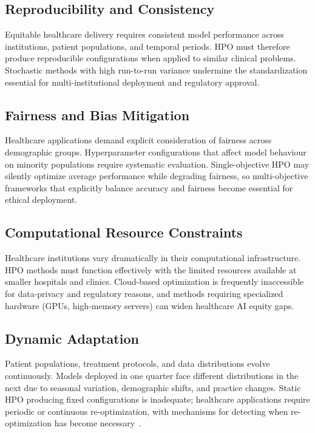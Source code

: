 \documentclass[letterpaper, 10 pt, conference]{ieeeconf}
\begin{document}
\subsection{Reproducibility and Consistency}

Equitable healthcare delivery requires consistent model performance across institutions, patient populations, and temporal periods. HPO must therefore produce reproducible configurations when applied to similar clinical problems. Stochastic methods with high run-to-run variance undermine the standardization essential for multi-institutional deployment and regulatory approval.

\subsection{Fairness and Bias Mitigation}

Healthcare applications demand explicit consideration of fairness across demographic groups. Hyperparameter configurations that affect model behaviour on minority populations require systematic evaluation. Single-objective HPO may silently optimize average performance while degrading fairness, so multi-objective frameworks that explicitly balance accuracy and fairness become essential for ethical deployment.

\subsection{Computational Resource Constraints}

Healthcare institutions vary dramatically in their computational infrastructure. HPO methods must function effectively with the limited resources available at smaller hospitals and clinics. Cloud-based optimization is frequently inaccessible for data-privacy and regulatory reasons, and methods requiring specialized hardware (GPUs, high-memory servers) can widen healthcare AI equity gaps.

\subsection{Dynamic Adaptation}

Patient populations, treatment protocols, and data distributions evolve continuously. Models deployed in one quarter face different distributions in the next due to seasonal variation, demographic shifts, and practice changes. Static HPO producing fixed configurations is inadequate; healthcare applications require periodic or continuous re-optimization, with mechanisms for detecting when re-optimization has become necessary~\cite{gama2014}.
\end{document}
